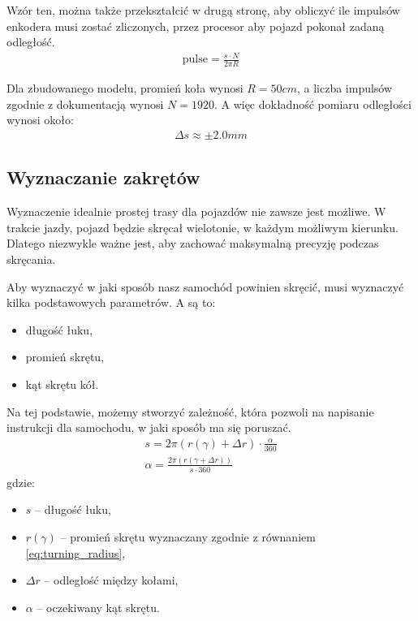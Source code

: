         Wzór ten, można także przekształcić w drugą stronę, aby obliczyć ile impulsów enkodera musi zostać zliczonych, przez procesor aby pojazd pokonał zadaną odległość.
        \begin{gather}
            \text{pulse} = \frac{s \cdot N}{2\pi R}
            \label{eq:distanceToPulse}
        \end{gather}

        Dla zbudowanego modelu, promień koła wynosi $R = 50cm$, a liczba impulsów zgodnie z dokumentacją wynosi $N = 1920$.
        A więc dokładność pomiaru odległości wynosi około:
        \begin{gather}
            \Delta s \approx \pm2.0mm
        \end{gather}


    \subsection{Wyznaczanie zakrętów}
        Wyznaczenie idealnie prostej trasy dla pojazdów nie zawsze jest możliwe.
        W trakcie jazdy, pojazd będzie skręcał wielotonie, w każdym możliwym kierunku.
        Dlatego niezwykle ważne jest, aby zachować maksymalną precyzję podczas skręcania.

        Aby wyznaczyć w jaki sposób nasz samochód powinien skręcić, musi wyznaczyć kilka podstawowych parametrów.
        A są to:
        \begin{itemize}
            \item długość łuku,
            \item promień skrętu,
            \item kąt skrętu kół.
        \end{itemize}
        Na tej podstawie, możemy stworzyć zależność, która pozwoli na napisanie instrukcji dla samochodu, w jaki sposób ma się poruszać.
        \begin{gather}
            s = 2\pi (r(\gamma) + \Delta r) \cdot \frac{\alpha}{360}
            \label{eq:turning_arc}
            \\
            \alpha = \frac{2\pi (r(\gamma + \Delta r))}{s \cdot 360}
        \end{gather}
        gdzie:
        \begin{itemize}
            \item $s$ -- długość łuku,
            \item $r(\gamma)$ -- promień skrętu wyznaczany zgodnie z równaniem \eqref{eq:turning_radius},
            \item $\Delta r$ -- odległość między kołami,
            \item $\alpha$ -- oczekiwany kąt skrętu.
        \end{itemize}

